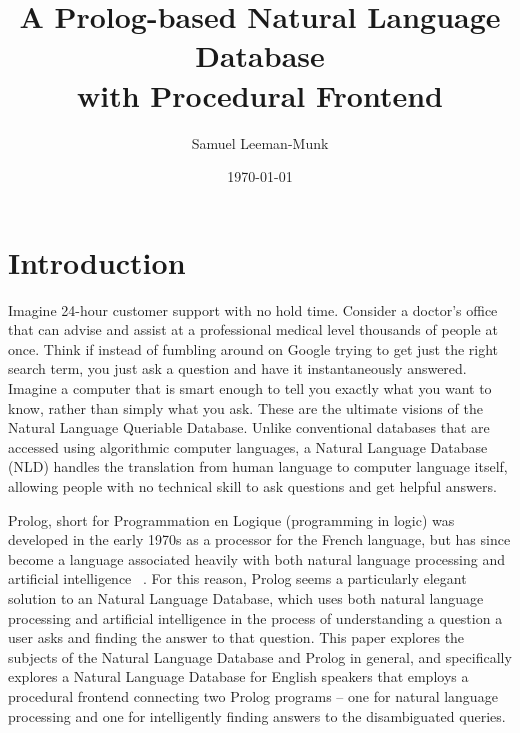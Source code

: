 \documentclass[12pt]{article}
\begin{document}
\author{Samuel Leeman-Munk}
\date{\today}
\title{A Prolog-based Natural Language Database \\ with Procedural Frontend}
\maketitle
{}
\clearpage
\section*{Introduction}
Imagine 24-hour customer support with no hold time. Consider a doctor's office that can advise and assist at a professional medical level thousands of people at once. Think if instead of fumbling around on Google trying to get just the right search term, you just ask a question and have it instantaneously answered. Imagine a computer that is smart enough to tell you exactly what you want to know, rather than simply what you ask. These are the ultimate visions of the Natural Language Queriable Database. Unlike conventional databases that are accessed using algorithmic computer languages, a Natural Language Database (NLD) handles the translation from human language to computer language itself, allowing people with no technical skill to ask questions and get helpful answers.

Prolog, short for Programmation en Logique (programming in logic) was developed in the early 1970s as a processor for the French language, but has since become a language associated heavily with both natural language processing and artificial intelligence ~\citep{birthofprolog}. For this reason, Prolog seems a particularly elegant solution to an Natural Language Database, which uses both natural language processing and artificial intelligence in the process of understanding a question a user asks and finding the answer to that question. This paper explores the subjects of the Natural Language Database and Prolog in general, and specifically explores a Natural Language Database for English speakers that employs a procedural frontend connecting two Prolog programs -- one for natural language processing and one for intelligently finding answers to the disambiguated queries.
\end{document}
